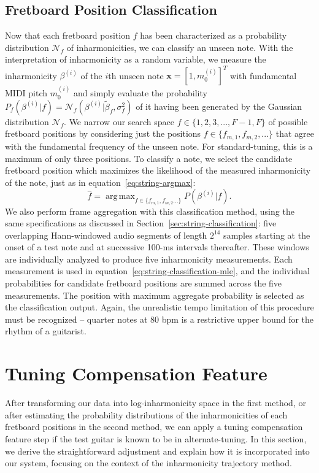 \documentclass[12pt]{cmuthesis}
\DeclareMathOperator*{\argmax}{arg\,max}
\begin{document}
\subsection{Fretboard Position Classification}
Now that each fretboard position $f$ has been characterized as a probability distribution $\mathcal{N}_f$ of inharmonicities, we can classify an unseen note. With the interpretation of inharmonicity as a random variable, we measure the inharmonicity $\beta^{(i)}$ of the $i$th unseen note $\mathbf{x}=[1,m_0^{(i)}]^T$ with fundamental MIDI pitch $m_0^{(i)}$ and simply evaluate the probability $P_f(\beta^{(i)} | f) = \mathcal{N}_f(\beta^{(i)} | \tilde{\beta}_f,\sigma^2_f)$ of it having been generated by the Gaussian distribution $\mathcal{N}_f$. We narrow our search space $f \in \{1,2,3,...,F-1,F\}$ of possible fretboard positions by considering just the positions $f \in \{f_{m,1},f_{m,2},...\}$ that agree with the fundamental frequency of the unseen note. For standard-tuning, this is a maximum of only three positions. To classify a note, we select the candidate fretboard position which maximizes the likelihood of the measured inharmonicity of the note, just as in equation~\eqref{eq:string-argmax}:
\begin{equation}
\hat{f} = \argmax_{f\in\{f_{m,1},f_{m,2}...\}}P(\beta^{(i)} | f).
\label{eq:string-classification-mle}
\end{equation}
We also perform frame aggregation with this classification method, using the same specifications as discussed in Section~\ref{sec:string-classification}: five overlapping Hann-windowed audio segments of length $2^{14}$ samples starting at the onset of a test note and at successive 100-ms intervals thereafter. These windows are individually analyzed to produce five inharmonicity measurements. Each measurement is used in equation~\eqref{eq:string-classification-mle}, and the individual probabilities for candidate fretboard positions are summed across the five measurements. The position with maximum aggregate probability is selected as the classification output. Again, the unrealistic tempo limitation of this procedure must be recognized -- quarter notes at 80 bpm is a restrictive upper bound for the rhythm of a guitarist.

\section{Tuning Compensation Feature}
After transforming our data into log-inharmonicity space in the first method, or after estimating the probability distributions of the inharmonicities of each fretboard positions in the second method, we can apply a tuning compensation feature step if the test guitar is known to be in alternate-tuning. In this section, we derive the straightforward adjustment and explain how it is incorporated into our system, focusing on the context of the inharmonicity trajectory method.
\end{document}
